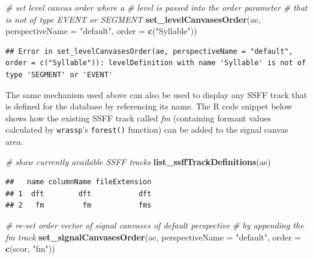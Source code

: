 \documentclass[]{book}
\newenvironment{Shaded}{\begin{snugshade}}{\end{snugshade}}
\newcommand{\CommentTok}[1]{\textcolor[rgb]{0.56,0.35,0.01}{\textit{#1}}}
\newcommand{\DataTypeTok}[1]{\textcolor[rgb]{0.13,0.29,0.53}{#1}}
\newcommand{\KeywordTok}[1]{\textcolor[rgb]{0.13,0.29,0.53}{\textbf{#1}}}
\newcommand{\NormalTok}[1]{#1}
\newcommand{\StringTok}[1]{\textcolor[rgb]{0.31,0.60,0.02}{#1}}
\begin{document}
\begin{Shaded}
\begin{Highlighting}[]
\CommentTok{# set level canvas order where a}
\CommentTok{# level is passed into the order parameter}
\CommentTok{# that is not of type EVENT or SEGMENT}
\KeywordTok{set_levelCanvasesOrder}\NormalTok{(ae,}
                       \DataTypeTok{perspectiveName =} \StringTok{"default"}\NormalTok{,}
                       \DataTypeTok{order =} \KeywordTok{c}\NormalTok{(}\StringTok{"Syllable"}\NormalTok{))}
\end{Highlighting}
\end{Shaded}

\begin{verbatim}
## Error in set_levelCanvasesOrder(ae, perspectiveName = "default", order = c("Syllable")): levelDefinition with name 'Syllable' is not of type 'SEGMENT' or 'EVENT'
\end{verbatim}

The same mechanism used above can also be used to display any SSFF track that is defined for the database by referencing its name. The R code snippet below shows how the existing SSFF track called \emph{fm} (containing formant values calculated by \texttt{wrassp}'s \texttt{forest()} function) can be added to the signal canvas area.

\begin{Shaded}
\begin{Highlighting}[]
\CommentTok{# show currently available SSFF tracks}
\KeywordTok{list_ssffTrackDefinitions}\NormalTok{(ae)}
\end{Highlighting}
\end{Shaded}

\begin{verbatim}
##   name columnName fileExtension
## 1  dft        dft           dft
## 2   fm         fm           fms
\end{verbatim}

\begin{Shaded}
\begin{Highlighting}[]
\CommentTok{# re-set order vector of signal canvases of default perspective}
\CommentTok{# by appending the fm track}
\KeywordTok{set_signalCanvasesOrder}\NormalTok{(ae,}
                        \DataTypeTok{perspectiveName =} \StringTok{"default"}\NormalTok{,}
                        \DataTypeTok{order =} \KeywordTok{c}\NormalTok{(scor, }\StringTok{"fm"}\NormalTok{))}
\end{Highlighting}
\end{Shaded}
\end{document}
